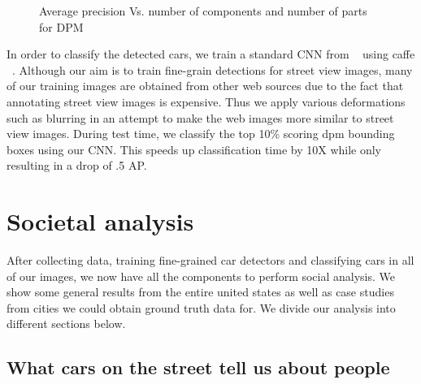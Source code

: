 \documentclass[10pt,twocolumn,letterpaper]{article}
\begin{document}
\begin{figure}[t]
\begin{center}
\fbox{\rule{0pt}{2in} \rule{0.9\linewidth}{0pt}}
\end{center}
   \caption{Average precision Vs. number of components and number of parts for DPM}
\label{fig:dpm_acc}
\end{figure}

In order to classify the detected cars, we train a standard CNN from ~\cite{alexnet} using caffe ~\cite{caffe}. Although our aim is to train fine-grain detections for street view images, many of our training images are obtained from other web sources due to the fact that annotating street view images is expensive. Thus we apply various deformations such as blurring in an attempt to make the web images more similar to street view images. During test time, we classify the top 10\% scoring dpm bounding boxes using our CNN. This speeds up classification time by 10X while only resulting in a drop of .5 AP. 

\section{Societal analysis}
\label{sec:social}
After collecting data, training fine-grained car detectors and classifying cars in all of our images, we now have all the components to perform social analysis. We show some general results from the entire united states as well as case studies from cities we could obtain ground truth data for. We divide our analysis into different sections below.

\subsection{What cars on the street tell us about people}
\end{document}
